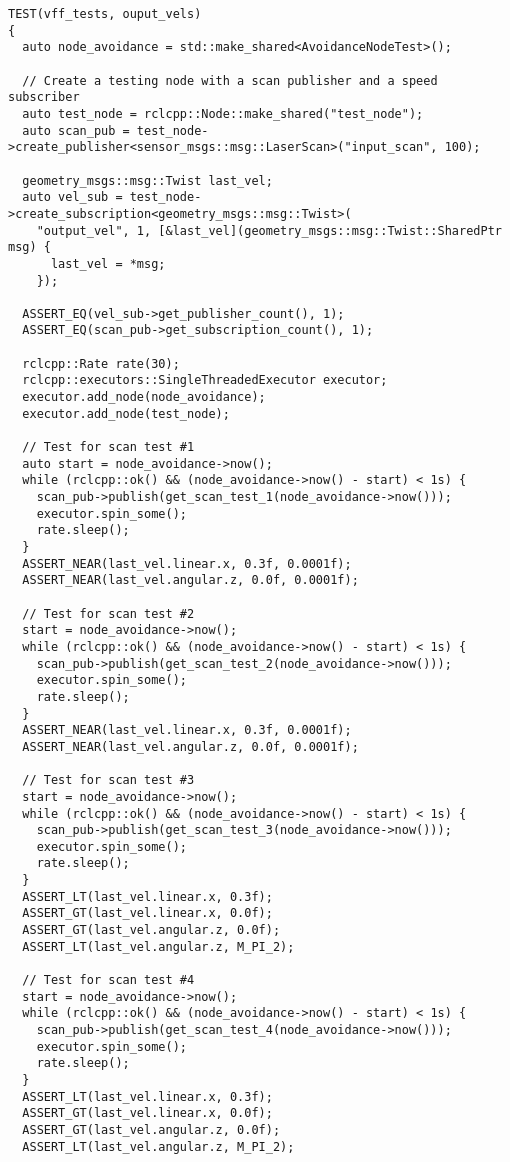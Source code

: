 \begin{tcolorbox}[sharp corners, colframe=gray!80, colback=LightGray, left=0pt, top=0pt, bottom=0pt, title=\texttt{br2\_vff\_avoidance/tests/vff\_test.cpp}]
\begin{verbatim}
TEST(vff_tests, ouput_vels)
{
  auto node_avoidance = std::make_shared<AvoidanceNodeTest>();

  // Create a testing node with a scan publisher and a speed subscriber
  auto test_node = rclcpp::Node::make_shared("test_node");
  auto scan_pub = test_node->create_publisher<sensor_msgs::msg::LaserScan>("input_scan", 100);

  geometry_msgs::msg::Twist last_vel;
  auto vel_sub = test_node->create_subscription<geometry_msgs::msg::Twist>(
    "output_vel", 1, [&last_vel](geometry_msgs::msg::Twist::SharedPtr msg) {
      last_vel = *msg;
    });

  ASSERT_EQ(vel_sub->get_publisher_count(), 1);
  ASSERT_EQ(scan_pub->get_subscription_count(), 1);

  rclcpp::Rate rate(30);
  rclcpp::executors::SingleThreadedExecutor executor;
  executor.add_node(node_avoidance);
  executor.add_node(test_node);

  // Test for scan test #1
  auto start = node_avoidance->now();
  while (rclcpp::ok() && (node_avoidance->now() - start) < 1s) {
    scan_pub->publish(get_scan_test_1(node_avoidance->now()));
    executor.spin_some();
    rate.sleep();
  }
  ASSERT_NEAR(last_vel.linear.x, 0.3f, 0.0001f);
  ASSERT_NEAR(last_vel.angular.z, 0.0f, 0.0001f);

  // Test for scan test #2
  start = node_avoidance->now();
  while (rclcpp::ok() && (node_avoidance->now() - start) < 1s) {
    scan_pub->publish(get_scan_test_2(node_avoidance->now()));
    executor.spin_some();
    rate.sleep();
  }
  ASSERT_NEAR(last_vel.linear.x, 0.3f, 0.0001f);
  ASSERT_NEAR(last_vel.angular.z, 0.0f, 0.0001f);

  // Test for scan test #3
  start = node_avoidance->now();
  while (rclcpp::ok() && (node_avoidance->now() - start) < 1s) {
    scan_pub->publish(get_scan_test_3(node_avoidance->now()));
    executor.spin_some();
    rate.sleep();
  }
  ASSERT_LT(last_vel.linear.x, 0.3f);
  ASSERT_GT(last_vel.linear.x, 0.0f);
  ASSERT_GT(last_vel.angular.z, 0.0f);
  ASSERT_LT(last_vel.angular.z, M_PI_2);

  // Test for scan test #4
  start = node_avoidance->now();
  while (rclcpp::ok() && (node_avoidance->now() - start) < 1s) {
    scan_pub->publish(get_scan_test_4(node_avoidance->now()));
    executor.spin_some();
    rate.sleep();
  }
  ASSERT_LT(last_vel.linear.x, 0.3f);
  ASSERT_GT(last_vel.linear.x, 0.0f);
  ASSERT_GT(last_vel.angular.z, 0.0f);
  ASSERT_LT(last_vel.angular.z, M_PI_2);


\end{verbatim}
\end{tcolorbox}
